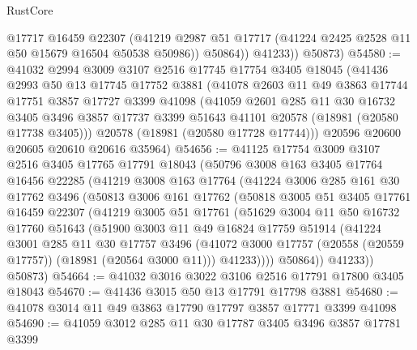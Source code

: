 \begin{lexlean}{RustCore}
\begin{coremodule}
              @17717
              @16459
              @22307
              (@41219 @2987 @51 @17717 (@41224 @2425 @2528 @11 @50 @15679 @16504 @50538 @50986))
              @50864))
          @41233))
      @50873)
@54580 := @41032
    @2994
    @3009
    @3107
    @2516
    @17745
    @17754
    @3405
    @18045
    (@41436
      @2993
      @50
      @13
      @17745
      @17752
      @3881
      (@41078
        @2603
        @11
        @49
        @3863
        @17744
        @17751
        @3857
        @17727
        @3399
        @41098
        (@41059
          @2601
          @285
          @11
          @30
          @16732
          @3405
          @3496
          @3857
          @17737
          @3399
          @51643
          @41101
          @20578
          (@18981 (@20580 @17738 @3405)))
        @20578
        (@18981 (@20580 @17728 @17744)))
      @20596
      @20600
      @20605
      @20610
      @20616
      @35964)
@54656 := @41125
    @17754
    @3009
    @3107
    @2516
    @3405
    @17765
    @17791
    @18043
    (@50796
      @3008
      @163
      @3405
      @17764
      @16456
      @22285
      (@41219
        @3008
        @163
        @17764
        (@41224
          @3006
          @285
          @161
          @30
          @17762
          @3496
          (@50813
            @3006
            @161
            @17762
            (@50818
              @3005
              @51
              @3405
              @17761
              @16459
              @22307
              (@41219
                @3005
                @51
                @17761
                (@51629
                  @3004
                  @11
                  @50
                  @16732
                  @17760
                  @51643
                  (@51900
                    @3003
                    @11
                    @49
                    @16824
                    @17759
                    @51914
                    (@41224
                      @3001
                      @285
                      @11
                      @30
                      @17757
                      @3496
                      (@41072 @3000 @17757 (@20558 (@20559 @17757)) (@18981 (@20564 @3000 @11)))
                      @41233))))
              @50864))
          @41233))
      @50873)
@54664 := @41032 @3016 @3022 @3106 @2516 @17791 @17800 @3405 @18043
@54670 := @41436 @3015 @50 @13 @17791 @17798 @3881
@54680 := @41078 @3014 @11 @49 @3863 @17790 @17797 @3857 @17771 @3399 @41098
@54690 := @41059 @3012 @285 @11 @30 @17787 @3405 @3496 @3857 @17781 @3399

\end{coremodule}
\end{lexlean}
